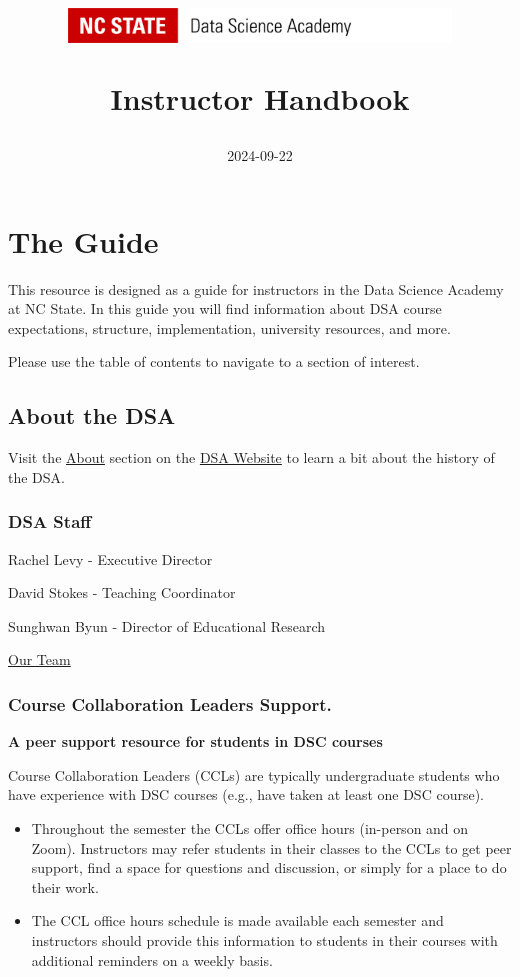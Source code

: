 \documentclass[
]{book}
\title{\includegraphics[width=4in,height=\textheight]{DSA Logo.png}

Instructor Handbook}
\author{2024-09-22}
\date{}
\providecommand{\tightlist}{%
  \setlength{\itemsep}{0pt}\setlength{\parskip}{0pt}}
\begin{document}
\maketitle

{
\setcounter{tocdepth}{1}
\tableofcontents
}
\chapter{The Guide}\label{the-guide}

This resource is designed as a guide for instructors in the Data Science Academy at NC State. In this guide you will find information about DSA course expectations, structure, implementation, university resources, and more.

Please use the table of contents to navigate to a section of interest.

\section{About the DSA}\label{about-the-dsa}

Visit the \href{https://datascienceacademy.ncsu.edu/about/}{About} section on the \href{https://datascienceacademy.ncsu.edu/}{DSA Website} to learn a bit about the history of the DSA.

\subsection{DSA Staff}\label{dsa-staff}

Rachel Levy - Executive Director

David Stokes - Teaching Coordinator

Sunghwan Byun - Director of Educational Research

\href{https://datascienceacademy.ncsu.edu/about/our-team/}{Our Team}

\subsection{Course Collaboration Leaders Support.}\label{course-collaboration-leaders-support.}

\textbf{A peer support resource for students in DSC courses}

Course Collaboration Leaders (CCLs) are typically undergraduate students who have experience with DSC courses (e.g., have taken at least one DSC course).

\begin{itemize}
\tightlist
\item
  Throughout the semester the CCLs offer office hours (in-person and on Zoom). Instructors may refer students in their classes to the CCLs to get peer support, find a space for questions and discussion, or simply for a place to do their work.
\item
  The CCL office hours schedule is made available each semester and instructors should provide this information to students in their courses with additional reminders on a weekly basis.
\end{itemize}
\end{document}
